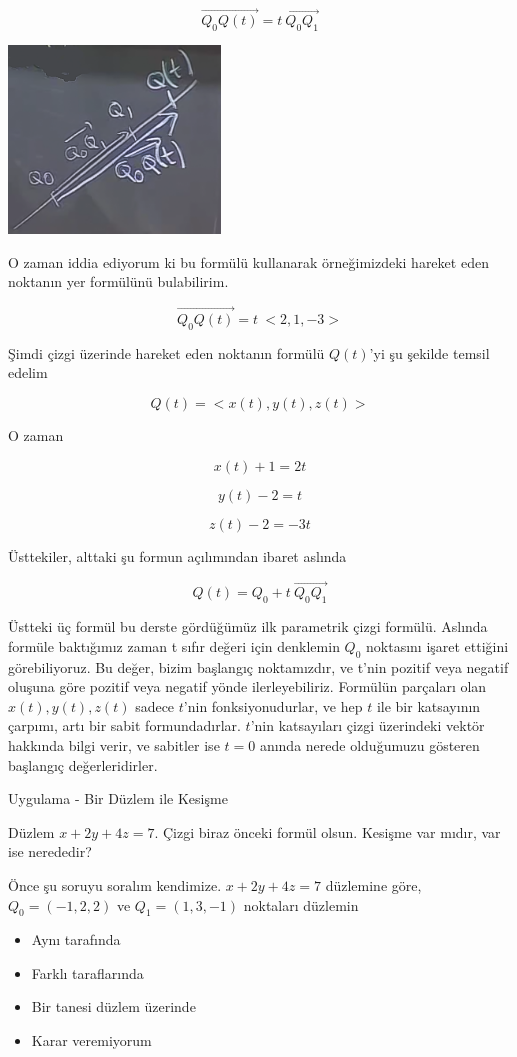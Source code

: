 \documentclass[12pt,fleqn]{article}\usepackage{../../common}
\begin{document}
$$ \vec{Q_0Q(t)} = t \ \vec{Q_0Q_1}  $$

\includegraphics[height=5cm]{5_2.png}

O zaman iddia ediyorum ki bu formülü kullanarak örneğimizdeki hareket eden
noktanın yer formülünü bulabilirim.

$$ \vec{Q_0Q(t)} = t \ <2,1,-3>  $$

Şimdi çizgi üzerinde hareket eden noktanın formülü $Q(t)$'yi şu şekilde
temsil edelim

$$ Q(t) = <x(t),y(t),z(t)> $$

O zaman

$$ x(t) + 1 = 2t $$

$$ y(t) - 2 = t $$

$$ z(t) - 2 = -3t $$

Üsttekiler, alttaki şu formun açılımından ibaret aslında

$$ Q(t) = Q_0 + t \ \vec{Q_0Q_1}  $$

Üstteki üç formül bu derste gördüğümüz ilk parametrik çizgi formülü. Aslında
formüle baktığımız zaman t sıfır değeri için denklemin $Q_0$ noktasını işaret
ettiğini görebiliyoruz. Bu değer, bizim başlangıç noktamızdır, ve t'nin pozitif
veya negatif oluşuna göre pozitif veya negatif yönde ilerleyebiliriz.  Formülün
parçaları olan $x(t),y(t),z(t)$ sadece $t$'nin fonksiyonudurlar, ve hep $t$ ile
bir katsayının çarpımı, artı bir sabit formundadırlar. $t$'nin katsayıları çizgi
üzerindeki vektör hakkında bilgi verir, ve sabitler ise $t=0$ anında nerede
olduğumuzu gösteren başlangıç değerleridirler.

Uygulama - Bir Düzlem ile Kesişme

Düzlem $x+2y+4z=7$. Çizgi biraz önceki formül olsun. Kesişme var mıdır, var
ise nerededir? 

Önce şu soruyu soralım kendimize. $x+2y+4z=7$ düzlemine göre, 
$Q_0 =(-1,2,2)$ ve $Q_1 = (1,3,-1)$ noktaları düzlemin

\begin{itemize}
   \item Aynı tarafında
   \item Farklı taraflarında
   \item Bir tanesi düzlem üzerinde
   \item Karar veremiyorum
\end{itemize}
\end{document}
